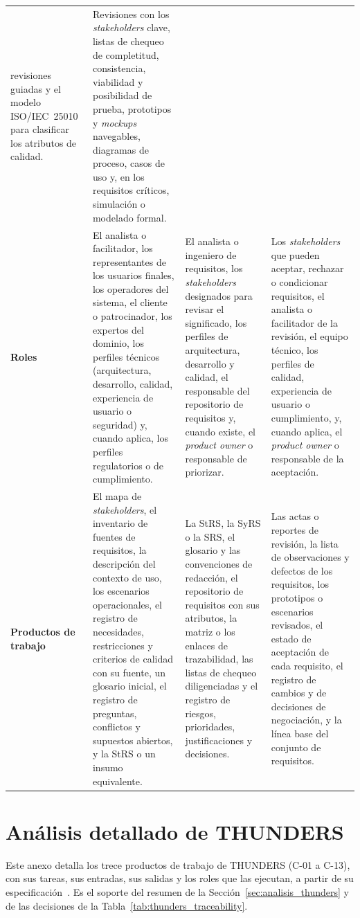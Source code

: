 \documentclass[12pt,letterpaper,oneside]{report}
\begin{document}
{\begin{xltabular}{\textwidth}{@{}>{\raggedright\arraybackslash}p{1.7cm}
  >{\raggedright\arraybackslash}X >{\raggedright\arraybackslash}X
  >{\raggedright\arraybackslash}X@{}}
revisiones guiadas y el modelo ISO/IEC~25010 para clasificar los atributos de
calidad. &
Revisiones con los \textit{stakeholders} clave, listas de chequeo de
completitud, consistencia, viabilidad y posibilidad de prueba, prototipos y
\textit{mockups} navegables, diagramas de proceso, casos de uso y, en los
requisitos críticos, simulación o modelado formal. \\
\addlinespace
\textbf{Roles} &
El analista o facilitador, los representantes de los usuarios finales, los
operadores del sistema, el cliente o patrocinador, los expertos del dominio, los
perfiles técnicos (arquitectura, desarrollo, calidad, experiencia de usuario o
seguridad) y, cuando aplica, los perfiles regulatorios o de cumplimiento. &
El analista o ingeniero de requisitos, los \textit{stakeholders} designados para
revisar el significado, los perfiles de arquitectura, desarrollo y calidad, el
responsable del repositorio de requisitos y, cuando existe, el \textit{product
owner} o responsable de priorizar. &
Los \textit{stakeholders} que pueden aceptar, rechazar o condicionar requisitos,
el analista o facilitador de la revisión, el equipo técnico, los perfiles de
calidad, experiencia de usuario o cumplimiento, y, cuando aplica, el
\textit{product owner} o responsable de la aceptación. \\
\addlinespace
\textbf{Productos de trabajo} &
El mapa de \textit{stakeholders}, el inventario de fuentes de requisitos, la
descripción del contexto de uso, los escenarios operacionales, el registro de
necesidades, restricciones y criterios de calidad con su fuente, un glosario
inicial, el registro de preguntas, conflictos y supuestos abiertos, y la StRS o
un insumo equivalente. &
La StRS, la SyRS o la SRS, el glosario y las convenciones de redacción, el
repositorio de requisitos con sus atributos, la matriz o los enlaces de
trazabilidad, las listas de chequeo diligenciadas y el registro de riesgos,
prioridades, justificaciones y decisiones. &
Las actas o reportes de revisión, la lista de observaciones y defectos de los
requisitos, los prototipos o escenarios revisados, el estado de aceptación de
cada requisito, el registro de cambios y de decisiones de negociación, y la
línea base del conjunto de requisitos. \\
\end{xltabular}}

\chapter{Análisis detallado de THUNDERS}
\label{anx:thunders}
Este anexo detalla los trece productos de trabajo de THUNDERS (C-01 a C-13), con sus
tareas, sus entradas, sus salidas y los roles que las ejecutan, a partir de su
especificación~\cite{agredo2022thesis}. Es el soporte del resumen de la
Sección~\ref{sec:analisis_thunders} y de las decisiones de la
Tabla~\ref{tab:thunders_traceability}.
\end{document}
